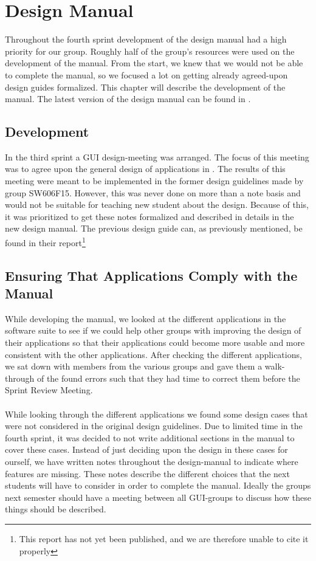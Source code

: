 
\chapter{Design Manual}
\label{cha:design_manual}

Throughout the fourth sprint development of the design manual had a high priority for our group. Roughly half of the group's resources were used on the development of the manual. From the start, we knew that we would not be able to complete the manual, so we focused a lot on getting already agreed-upon design guides formalized. This chapter will describe the development of the manual. The latest version of the design manual can be found in .

\section{Development}
\label{sec:development}
In the third sprint a GUI design-meeting was arranged. The focus of this meeting was to agree upon the general design of applications in \giraf. The results of this meeting were meant to be implemented in the former design guidelines made by group SW606F15. However, this was never done on more than a note basis and would not be suitable for teaching new student about the design. Because of this, it was prioritized to get these notes formalized and described in details in the new design manual. The previous design guide can, as previously mentioned, be found in their report\footnote{This report has not yet been published, and we are therefore unable to cite it properly}

\section{Ensuring That Applications Comply with the Manual}
\label{sec:ensuring_that_applications_comply_with_the_manual}
While developing the manual, we looked at the different applications in the \giraf software suite to see if we could help other groups with improving the design of their applications so that their applications could become more usable and more consistent with the other applications. After checking the different applications, we sat down with members from the various groups and gave them a walk-through of the found errors such that they had time to correct them before the Sprint Review Meeting. 
\\\\
While looking through the different applications we found some design cases that were not considered in the original design guidelines. Due to limited time in the fourth sprint, it was decided to not write additional sections in the manual to cover these cases. Instead of just deciding upon the design in these cases for ourself, we have written notes throughout the design-manual to indicate where features are missing. These notes describe the different choices that the next students will have to consider in order to complete the manual. Ideally the groups next semester should have a meeting between all GUI-groups to discuss how these things should be described.